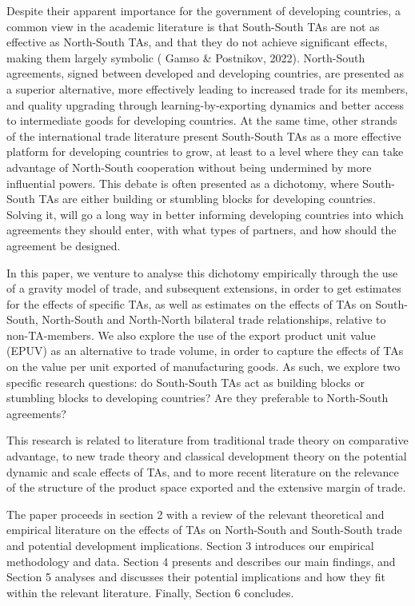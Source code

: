 Despite their apparent importance for the government of developing
countries, a common view in the academic literature is that South-South
TAs are not as effective as North-South TAs, and that they do not
achieve significant effects, making them largely symbolic (\cite{gamso_leveling-up_2022} Gamso \&
Postnikov, 2022). North-South agreements, signed between developed and
developing countries, are presented as a superior alternative, more
effectively leading to increased trade for its members, and quality
upgrading through learning-by-exporting dynamics and better access to
intermediate goods for developing countries. At the same time, other
strands of the international trade literature present South-South TAs as
a more effective platform for developing countries to grow, at least to
a level where they can take advantage of North-South cooperation without
being undermined by more influential powers. This debate is often
presented as a dichotomy, where South-South TAs are either building or
stumbling blocks for developing countries. Solving it, will go a long
way in better informing developing countries into which agreements they
should enter, with what types of partners, and how should the agreement
be designed.

In this paper, we venture to analyse this dichotomy empirically through
the use of a gravity model of trade, and subsequent extensions, in order
to get estimates for the effects of specific TAs, as well as estimates
on the effects of TAs on South-South, North-South and North-North
bilateral trade relationships, relative to non-TA-members. We also
explore the use of the export product unit value (EPUV) as an
alternative to trade volume, in order to capture the effects of TAs on
the value per unit exported of manufacturing goods. As such, we explore
two specific research questions: do South-South TAs act as building
blocks or stumbling blocks to developing countries? Are they preferable
to North-South agreements?

This research is related to literature from traditional trade theory on
comparative advantage, to new trade theory and classical development
theory on the potential dynamic and scale effects of TAs, and to more
recent literature on the relevance of the structure of the product space
exported and the extensive margin of trade.

The paper proceeds in section 2 with a review of the relevant
theoretical and empirical literature on the effects of TAs on
North-South and South-South trade and potential development
implications. Section 3 introduces our empirical methodology and data.
Section 4 presents and describes our main findings, and Section 5
analyses and discusses their potential implications and how they fit
within the relevant literature. Finally, Section 6 concludes.